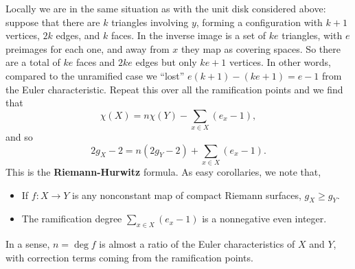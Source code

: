 \documentclass[12pt]{article}
\theoremstyle{definition}
\theoremstyle{remark}
\begin{document}
Locally we are in the same situation as with the unit disk considered above: suppose that there are $k$ triangles involving $y$, forming a configuration with $k + 1$ vertices, $2k$ edges, and $k$ faces. In the inverse image is a set of $ke$ triangles, with $e$ preimages for each one, and away from $x$ they map as covering spaces. So there are a total of $ke$ faces and $2ke$ edges but only $ke + 1$ vertices. In other words, compared to the unramified case we ``lost'' $e(k+1) - (ke+1) = e-1$ from the Euler characteristic.  Repeat this over all the ramification points and we find that 
\begin{equation}
    \chi(X) = n \chi(Y) - \sum\limits_{x \in X} (e_x - 1),
\end{equation}
and so 
\begin{equation}
    2 g_X - 2 = n (2g_Y - 2) + \sum\limits_{x \in X} (e_x - 1).
\end{equation}
This is the \textbf{Riemann-Hurwitz} formula. As easy corollaries, we note that,
\begin{itemize}
    \item If $f : X \to Y$ is any nonconstant map of compact Riemann surfaces, $g_X \geq g_Y$.
    \item The ramification degree $\sum\limits_{x \in X} (e_x - 1)$ is a nonnegative even integer.
\end{itemize}
In a sense, $n = \deg f$ is almost a ratio of the Euler characteristics of $X$ and $Y$, with correction terms coming from the ramification points.
\end{document}
